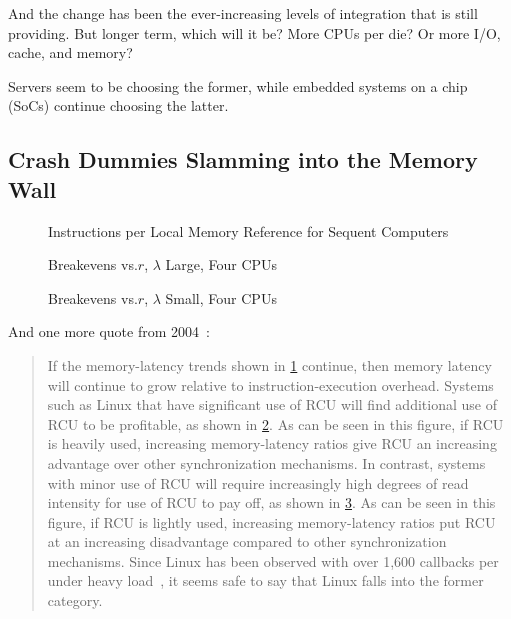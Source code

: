 And the change has been the ever-increasing levels of integration
that  is still providing.
But longer term, which will it be?
More CPUs per die?
Or more I/O, cache, and memory?

Servers seem to be choosing the former, while embedded systems on a chip
(SoCs) continue choosing the latter.

\subsection{Crash Dummies Slamming into the Memory Wall}
\label{sec:future:Crash Dummies Slamming into the Memory Wall}

\begin{figure}
\centering
\epsfxsize=3in
\caption{Instructions per Local Memory Reference for Sequent Computers}
\label{fig:future:Instructions per Local Memory Reference for Sequent Computers}
\end{figure}

\begin{figure}
\centering
\epsfxsize=3in
\caption{Breakevens vs.\@ $r$, $\lambda$ Large, Four CPUs}
\label{fig:future:Breakevens vs. r; lambda Large; Four CPUs}
\end{figure}

\begin{figure}
\centering
\epsfxsize=3in
\caption{Breakevens vs.\@ $r$, $\lambda$ Small, Four CPUs}
\label{fig:future:Breakevens vs. r; Worst-Case lambda; Four CPUs}
\end{figure}

And one more quote from 2004~\cite{PaulEdwardMcKenneyPhD}:

\begin{quote}
	If the memory-latency trends shown in
	\cref{fig:future:Instructions per Local Memory Reference for Sequent Computers}
	continue, then memory latency will continue to grow relative
	to instruction-execution overhead.
	Systems such as Linux that have significant use of RCU will find
	additional use of RCU to be profitable, as shown in
	\cref{fig:future:Breakevens vs. r; lambda Large; Four CPUs}.
	As can be seen in this figure, if RCU is heavily used, increasing
	memory-latency ratios give RCU an increasing advantage over other
	synchronization mechanisms.
	In contrast, systems with minor
	use of RCU will require increasingly high degrees of read intensity
	for use of RCU to pay off, as shown in
	\cref{fig:future:Breakevens vs. r; Worst-Case lambda; Four CPUs}.
	As can be seen in this figure, if RCU is lightly used,
	increasing memory-latency ratios
	put RCU at an increasing disadvantage compared to other synchronization
	mechanisms.
	Since Linux has been observed with over 1,600 callbacks per  under heavy load~\cite{Sarma04c},
	it seems safe to say that Linux falls into the former category.
\end{quote}


